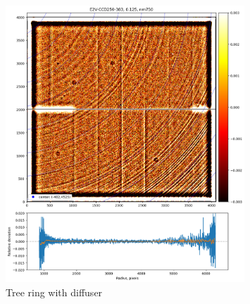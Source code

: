 \begin{figure}[ht]
\centering
\includegraphics[width=0.8\textwidth]{figures/TR_w_diffuser.png}
\caption{Tree ring with diffuser}
\end{figure}

\clearpage
